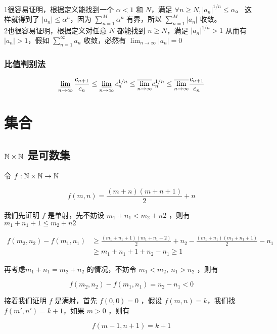 1很容易证明，根据定义能找到一个 $ \alpha < 1 $ 和 $N$，满足 $\forall n \ge N, \lvert a_n \rvert ^{1/n} \le \alpha $。
这样就得到了 $\lvert a_n \rvert \le \alpha ^n$，因为 $\sum_{n=1}^{M}\alpha^n$ 有界，所以 $\sum_{n=1}^{M}\lvert a_n \rvert $ 收敛。 \\

2也很容易证明，根据定义对任意 $N$ 都能找到 $n \ge N$，满足 $\lvert a_n \rvert ^{1/n} > 1$ 从而有 $\lvert a_n \rvert > 1$，假如 $\sum_{n=1}^{\infty}a_n$ 收敛，必然有 $\lim_{n \to \infty}\lvert a_n \rvert = 0$


\subsubsection{比值判别法}

\begin{align*}
\varliminf_{n \to \infty}\frac{c_{n+1}}{c_n} \le \varliminf_{n \to \infty} c_n ^{1/n} \le \overline{\lim_{n \to \infty}} c_n ^{1/n} \le \overline{\lim_{n \to \infty}} \frac{c_{n+1}}{c_n}
\end{align*}

\section{集合}

\subsection{$\mathbb{N} \times \mathbb{N}$ 是可数集}

令 $f: \mathbb{N} \times \mathbb{N} \to \mathbb{N}$

\[
f(m,n) = \frac{(m+n)(m+n+1)}{2} + n
\]

我们先证明 $f$ 是单射，先不妨设 $m_1+ n_1 < m_2 + n2$ ，则有 $ m_1+ n_1 + 1 \le m_2 + n2$

\begin{align*}
f(m_2, n_2) - f(m_1, n_1) & \ge \frac{(m_1+n_1+1)(m_1+n_1 + 2)}{2} + n_2 - \frac{(m_1+n_1)(m_1+n_1+1)}{2} - n_1 \\
    & \ge m_1+n_1+1 + n_2 - n_1 \ge 1
\end{align*}

再考虑$m_1 + n_1 = m_2 + n_2$ 的情况，不妨令 $m_1 < m_2, \: n_1 > n_2$ ，则有

\[
f(m_2,n_2) - f(m_1, n_1) = n_2 - n_1 < 0
\]

接着我们证明 $f$ 是满射，首先 $f(0, 0) = 0$ ，假设 $f(m,n) = k$，我们找 $f(m',n') = k+1$，如果 $m > 0$ ，则有 

\[
f(m-1,n+1) = k +1
\]

